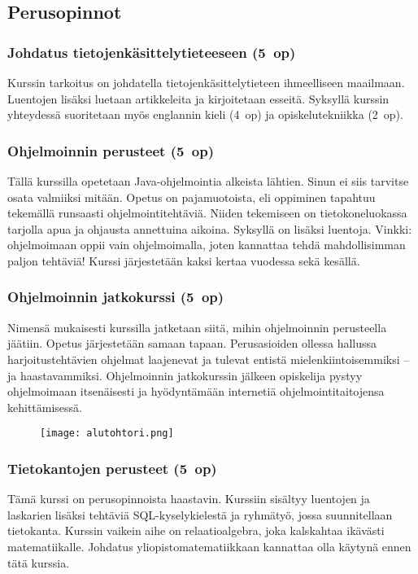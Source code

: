 \documentclass[../ala_hataile.tex]{subfiles}
\begin{document}
	\subsection*{Perusopinnot}
	
	\subsubsection*{Johdatus tietojen\-käsittely\-tieteeseen (5~op)}
	Kurssin tarkoitus on johdatella tietojen\-käsittely\-tieteen
	ihmeelliseen maailmaan.
	Luentojen lisäksi luetaan artikkeleita ja kirjoitetaan
	esseitä. Syksyllä kurssin yhteydessä suoritetaan
	myös englannin kieli (4~op) ja opiskelutekniikka
	(2~op).
	
	\subsubsection*{Ohjelmoinnin perusteet (5~op)}
	Tällä kurssilla opetetaan Java-ohjelmointia
	alkeista lähtien. Sinun ei siis tarvitse
	osata valmiiksi mitään. Opetus on
	pajamuotoista, eli oppiminen tapahtuu
	tekemällä runsaasti ohjelmointitehtäviä.
	Niiden tekemiseen on tietokoneluokassa
	tarjolla apua ja ohjausta annettuina aikoina.
	Syksyllä on lisäksi luentoja. Vinkki: ohjelmoimaan
	oppii vain ohjelmoimalla, joten
	kannattaa tehdä mahdollisimman paljon
	tehtäviä! Kurssi järjestetään kaksi kertaa
	vuodessa sekä kesällä.
	
	\subsubsection*{Ohjelmoinnin jatkokurssi (5~op)}
	Nimensä mukaisesti kurssilla jatketaan
	siitä, mihin ohjelmoinnin perusteella jäätiin.
	Opetus järjestetään samaan tapaan.
	Perusasioiden ollessa hallussa harjoitustehtävien
	ohjelmat laajenevat ja tulevat entistä
	mielenkiintoisemmiksi -- ja haastavammiksi.
	Ohjelmoinnin jatkokurssin jälkeen opiskelija
	pystyy ohjelmoimaan itsenäisesti ja
	hyödyntämään internetiä ohjelmointitaitojensa
	kehittämisessä.
	\begin{figure}[b]
		\centering
		\texttt{[image: alutohtori.png]}
	\end{figure}
	
	\subsubsection*{Tietokantojen perusteet (5~op)}
	Tämä kurssi on perusopinnoista haastavin.
	Kurssiin sisältyy luentojen ja laskarien
	lisäksi tehtäviä SQL-kyselykielestä ja
	ryhmätyö, jossa suunnitellaan tietokanta.
	Kurssin vaikein aihe on relaatioalgebra,
	joka kalskahtaa ikävästi matematiikalle.
	Johdatus yliopisto\-matematiikkaan kannattaa
	olla käytynä ennen tätä kurssia.
	
\end{document}
